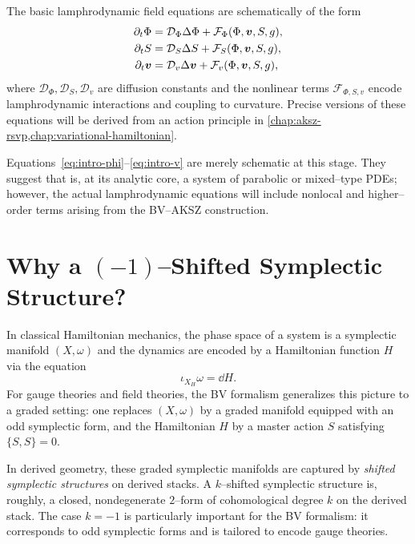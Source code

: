 The basic lamphrodynamic field equations are schematically of the form
\begin{align}
  \partial_t \Phi &=
    \mathcal{D}_\Phi \Delta \Phi
    + \mathcal{F}_\Phi(\Phi,\bm{v},S,g), \label{eq:intro-phi}\\
  \partial_t S &=
    \mathcal{D}_S \Delta S
    + \mathcal{F}_S(\Phi,\bm{v},S,g), \label{eq:intro-S}\\
  \partial_t \bm{v} &=
    \mathcal{D}_v \Delta \bm{v}
    + \mathcal{F}_v(\Phi,\bm{v},S,g), \label{eq:intro-v}
\end{align}
where $\mathcal{D}_\Phi,\mathcal{D}_S,\mathcal{D}_v$ are diffusion constants
and the nonlinear terms $\mathcal{F}_{\Phi,S,v}$ encode lamphrodynamic
interactions and coupling to curvature. Precise versions of these equations
will be derived from an action principle in \cref{chap:aksz-rsvp,chap:variational-hamiltonian}.

\Warning
Equations~\eqref{eq:intro-phi}--\eqref{eq:intro-v} are merely schematic at this
stage. They suggest that \rsvpabbr{} is, at its analytic core, a system of
parabolic or mixed--type PDEs; however, the actual lamphrodynamic equations
will include nonlocal and higher--order terms arising from the BV--AKSZ
construction.

\section{Why a $(-1)$--Shifted Symplectic Structure?}

In classical Hamiltonian mechanics, the phase space of a system is a symplectic
manifold $(X,\omega)$ and the dynamics are encoded by a Hamiltonian function
$H$ via the equation
\[
  \iota_{X_H}\omega = \dd H.
\]
For gauge theories and field theories, the BV formalism generalizes this
picture to a graded setting: one replaces $(X,\omega)$ by a graded manifold
equipped with an odd symplectic form, and the Hamiltonian $H$ by a master
action $S$ satisfying $\{S,S\}=0$.

In derived geometry, these graded symplectic manifolds are captured by
\emph{shifted symplectic structures} on derived stacks. A $k$--shifted
symplectic structure is, roughly, a closed, nondegenerate $2$--form of
cohomological degree $k$ on the derived stack. The case $k=-1$ is particularly
important for the BV formalism: it corresponds to odd symplectic forms and is
tailored to encode gauge theories.

